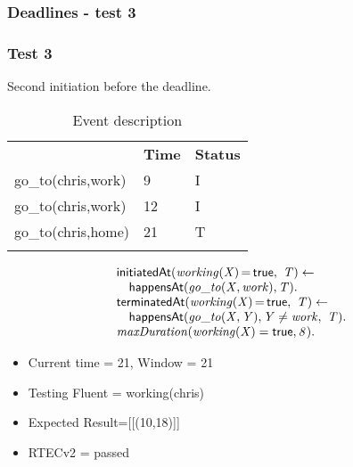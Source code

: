 \documentclass[8pt]{beamer}
\DeclareMathOperator{\val}{=}  %
\def \patsize {}
\def\happensAt{\textsf{\patsize happensAt}}
\def\initiatedAt{\textsf{\patsize initiatedAt}}
\def\terminatedAt{\textsf{\patsize terminatedAt}}
\def\true{\textsf{\patsize true}}
\newenvironment{mysplit}%
  {\arraycolsep 0pt \begin{array}{l}}%
  {\end{array}}
\begin{document}
\begin{frame}
    \frametitle{Deadlines - test 3}
    \subsubsection{Test 3}
    \small
    Second initiation before the deadline.\linebreak
    \begin{minipage}{0.48\linewidth}
        \begin{table}[t!]
            \caption{Event description}
            \begin{center}

                \begin{tabular}{lll}
                    \hline\noalign{\smallskip}
                    \multicolumn{1}{l}{\textbf{Event}} & \multicolumn{1}{c}{\textbf{Time}} & \multicolumn{1}{c}{\textbf{Status}} \\
                    go\_to(chris,work)& 9 & I\\
                    go\_to(chris,work)& 12 & I\\
                    go\_to(chris,home)& 21 & T\\
                    \noalign{\smallskip}
                    \hline
                \end{tabular}
            \end{center}
        \end{table}
    \end{minipage}
    \begin{minipage}{0.48\linewidth}
        \begin{align*}
            \begin{mysplit}
                \initiatedAt\mathit{(working(X)\val\true,\ T)\leftarrow}\\
                \quad    \happensAt\mathit{(go\_to(X,work),T)}.\\
                \terminatedAt\mathit{(working(X)\val\true,\ T) \leftarrow}\\
                \quad    \happensAt\mathit{(go\_to(X,Y),Y\neq work,\ T)}.\\
                \mathit{maxDuration(working(X)=\true,8)}.\\
            \end{mysplit}
        \end{align*}
    \end{minipage}
    \begin{itemize}
        \item Current time = 21, Window = 21
        \item Testing Fluent = working(chris)
        \item Expected Result=[[(10,18)]]
        \item RTECv2 = passed
    \end{itemize}
\end{frame}
\end{document}
